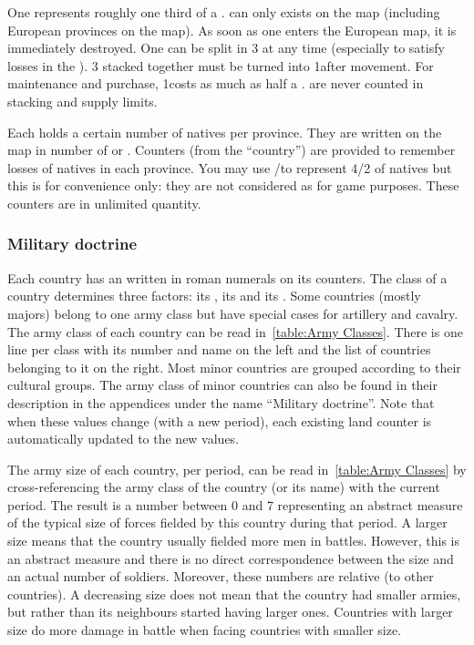  One \LDE represents roughly one third of
a \LD.
\bparag \LDE can only exists on the \ROTW map (including European provinces on
the \ROTW map). As soon as one \LDE enters the European map, it is immediately
destroyed.
\bparag One \LD can be split in 3 \LDE at any time (especially to satisfy
losses in the \ROTW). 3 \LDE stacked together must be turned into 1\LD after
movement.
\bparag For maintenance and purchase, 1\LDE costs as much as half a \LD.
\bparag \LDE are never counted in stacking and supply limits.

\aparag[Natives.] Each \ROTW \Area holds a certain number of natives per
province. They are written on the \ROTW map in number of \LD or \LDE.
\bparag Counters (from the  ``country'') are provided to
remember losses of natives in each province. You may use
\ARMY\faceplus/\facemoins to represent 4/2 \LD of natives but this is for
convenience only: they are not considered as \ARMY for game purposes. These
counters are in unlimited quantity.


\subsubsection{Military doctrine}
\aparag Each country has an  written in roman numerals on
its counters.
\bparag The class of a country determines three factors: its , its
 and its .
\bparag Some countries (mostly majors) belong to one army class but have
special cases for artillery and cavalry.
\bparag The army class of each country can be read in~\ref{table:Army
  Classes}. There is one line per class with its number and name on the left
and the list of countries belonging to it on the right.
\bparag Most minor countries are grouped according to their cultural groups.
\bparag The army class of minor countries can also be found in their
description in the appendices under the name ``Military doctrine''.
\bparag Note that when these values change (with a new period), each existing
land counter is automatically updated to the new values.


\aparag[Size.] The army size of each country, per period, can be read
in~\ref{table:Army Classes} by cross-referencing the army class of the country
(or its name) with the current period.
\bparag The result is a number between 0 and 7 representing an abstract
measure of the typical size of forces fielded by this country during that
period.
\bparag A larger size means that the country usually fielded more men in
battles. However, this is an abstract measure and there is no direct
correspondence between the size and an actual number of soldiers. Moreover,
these numbers are relative (to other countries). A decreasing size does not
mean that the country had smaller armies, but rather than its neighbours
started having larger ones.
\bparag Countries with larger size do more damage in battle when facing
countries with smaller size.

